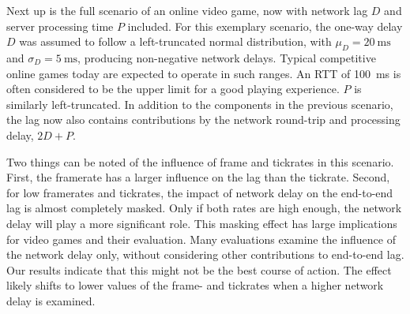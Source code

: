 
Next up is the full scenario of an online video game, now with network lag $D$ and server processing time $P$ included. For this exemplary scenario, the one-way delay $D$ was assumed to follow a left-truncated normal distribution, with $\mu_D = \SI{20}{\milli\second}$ and $\sigma_D = \SI{5}{\milli\second}$, producing non-negative network delays. Typical competitive online games today are expected to operate in such ranges. An \acrshort{RTT} of \SI{100}{\milli\second} is often considered to be the upper limit for a good playing experience. $P$ is similarly left-truncated. In addition to the components in the previous scenario, the lag now also contains contributions by the network round-trip and processing delay, $2D + P$.

Two things can be noted of the influence of frame and tickrates in this scenario. First, the framerate has a larger influence on the lag than the tickrate. Second, for low framerates and tickrates, the impact of network delay on the end-to-end lag is almost completely masked. Only if both rates are high enough, the network delay will play a more significant role. This masking effect has large implications for video games and their evaluation. Many evaluations examine the influence of the network delay only, without considering other contributions to end-to-end lag. Our results indicate that this might not be the best course of action. The effect likely shifts to lower values of the frame- and tickrates when a higher network delay is examined. %



